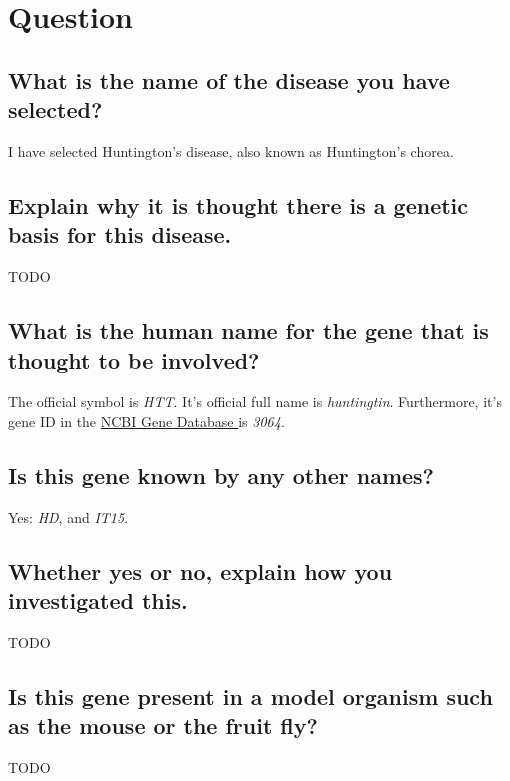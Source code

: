 \section{Question}

\subsection{What is the name of the disease you have selected?}

I have selected Huntington's disease, also known as Huntington's chorea.

\medskip


\subsection{Explain why it is thought there is a genetic basis for this disease.}

TODO

\medskip


\subsection{What is the human name for the gene that is thought to be involved?}

The official symbol is \textit{HTT}. It's official full name is \textit{huntingtin}. Furthermore, it's gene ID in the \href{http://www.ncbi.nlm.nih.gov/gene/}{NCBI Gene Database } is \textit{3064}.

\medskip


\subsection{Is this gene known by any other names?}

Yes: \textit{HD}, and \textit{IT15}.

\medskip


\subsection{Whether yes or no, explain how you investigated this.}

TODO

\medskip


\subsection{Is this gene present in a model organism such as the mouse or the fruit fly?}

TODO

\newpage

